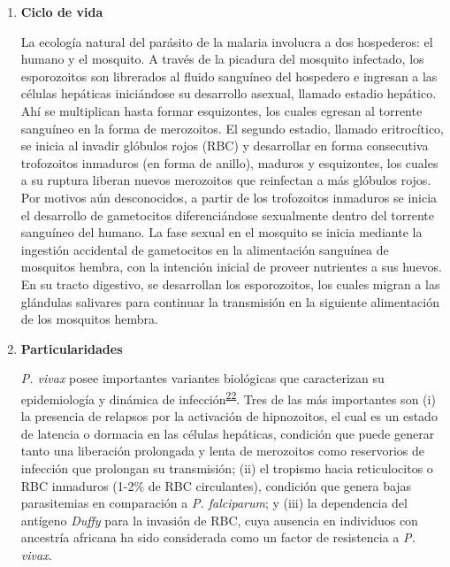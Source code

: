 \documentclass[]{article}
\begin{document}
\begin{enumerate}
  \begin{enumerate}
  \def\labelenumii{\roman{enumii}.}
  \item
    \textbf{Ciclo de vida}

    La ecología natural del parásito de la malaria involucra a dos
    hospederos: el humano y el mosquito. A través de la picadura del
    mosquito infectado, los esporozoitos son librerados al fluido
    sanguíneo del hospedero e ingresan a las células hepáticas
    iniciándose su desarrollo asexual, llamado estadio hepático. Ahí se
    multiplican hasta formar esquizontes, los cuales egresan al torrente
    sanguíneo en la forma de merozoitos. El segundo estadio, llamado
    eritrocítico, se inicia al invadir glóbulos rojos (RBC) y
    desarrollar en forma consecutiva trofozoitos inmaduros (en forma de
    anillo), maduros y esquizontes, los cuales a su ruptura liberan
    nuevos merozoitos que reinfectan a más glóbulos rojos. Por motivos
    aún desconocidos, a partir de los trofozoitos inmaduros se inicia el
    desarrollo de gametocitos diferenciándose sexualmente dentro del
    torrente sanguíneo del humano. La fase sexual en el mosquito se
    inicia mediante la ingestión accidental de gametocitos en la
    alimentación sanguínea de mosquitos hembra, con la intención inicial
    de proveer nutrientes a sus huevos. En su tracto digestivo, se
    desarrollan los esporozoitos, los cuales migran a las glándulas
    salivares para continuar la transmisión en la siguiente alimentación
    de los mosquitos hembra.
  \item
    \textbf{Particularidades}

    \emph{P. vivax} posee importantes variantes biológicas que
    caracterizan su epidemiología y dinámica de
    infección\textsuperscript{\protect\hyperlink{ref-howes2016global}{22}}.
    Tres de las más importantes son (i) la presencia de relapsos por la
    activación de hipnozoitos, el cual es un estado de latencia o
    dormacia en las células hepáticas, condición que puede generar tanto
    una liberación prolongada y lenta de merozoitos como reservorios de
    infección que prolongan su transmisión; (ii) el tropismo hacia
    reticulocitos o RBC inmaduros (1-2\% de RBC circulantes), condición
    que genera bajas parasitemias en comparación a \emph{P. falciparum};
    y (iii) la dependencia del antígeno \emph{Duffy} para la invasión de
    RBC, cuya ausencia en individuos con ancestría africana ha sido
    considerada como un factor de resistencia a \emph{P. vivax}. 
  \end{enumerate}
\end{enumerate}
\end{document}
